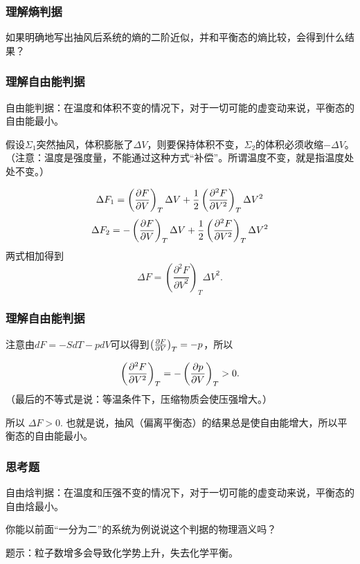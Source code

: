 \documentclass[CJK,13pt]{beamer}
\begin{document}
\begin{frame}
\frametitle{理解熵判据}


如果明确地写出抽风后系统的熵的二阶近似，并和平衡态的熵比较，会得到什么结果？

\end{frame}



\begin{frame}
\frametitle{理解自由能判据}
{\blue 自由能判据：在温度和体积不变的情况下，对于一切可能的虚变动来说，平衡态的自由能最小。}


假设$\Sigma_1$突然抽风，体积膨胀了$\Delta V$，则要保持体积不变，$\Sigma_2$的体积必须收缩$-\Delta V$。（注意：温度是强度量，不能通过这种方式“补偿”。所谓温度不变，就是指温度处处不变。）

\skipline


$$ \Delta F_1 = \left(\frac{\partial F}{\partial V}\right)_{T} \Delta V + \frac{1}{2} \left(\frac{\partial^2 F}{\partial V^2}\right)_T \Delta V^2 $$
$$ \Delta F_2 = -\left(\frac{\partial F}{\partial V}\right)_{T} \Delta V + \frac{1}{2} \left(\frac{\partial^2 F}{\partial V^2}\right)_T \Delta V^2 $$
两式相加得到
$$\Delta F =  \left(\frac{\partial^2 F}{\partial V^2}\right)_T \Delta V^2. $$

\end{frame}

\begin{frame}
\frametitle{理解自由能判据}
注意由$dF = -SdT - pdV$可以得到$\left(\frac{\partial F}{\partial V}\right)_{T} = -p$，所以

$$\left(\frac{\partial^2 F}{\partial V^2}\right)_T = -\left(\frac{\partial p}{\partial V}\right)_{T} > 0.  $$
（最后的不等式是说：等温条件下，压缩物质会使压强增大。）

所以 $\Delta F>0$. 也就是说，抽风（偏离平衡态）的结果总是使自由能增大，所以平衡态的自由能最小。

\end{frame}


\begin{frame}
\frametitle{思考题}
{\blue 自由焓判据：在温度和压强不变的情况下，对于一切可能的虚变动来说，平衡态的自由焓最小。}


你能以前面“一分为二”的系统为例说说这个判据的物理涵义吗？

\skipline

{\small 题示：粒子数增多会导致化学势上升，失去化学平衡。}

\end{frame}
\end{document}
